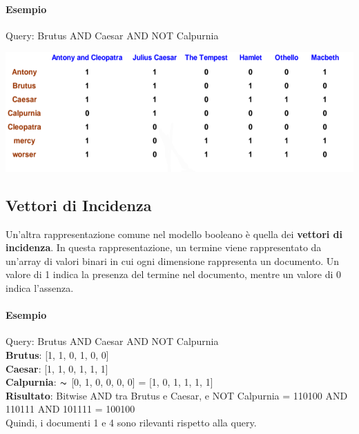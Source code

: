 \documentclass{report}
\begin{document}
	\paragraph{Esempio}
	Query: Brutus AND Caesar AND NOT Calpurnia
	\begin{center}
		\includegraphics[scale=0.6]{assets/booleanmatrix.png}
	\end{center}

	\subsection{Vettori di Incidenza}
	Un'altra rappresentazione comune nel modello booleano è quella dei \textbf{vettori di incidenza}. In questa rappresentazione, un termine viene rappresentato da un'array di valori binari in cui ogni dimensione rappresenta un documento. Un valore di 1 indica la presenza del termine nel documento, mentre un valore di 0 indica l'assenza. 

	\paragraph{Esempio}
	Query: Brutus AND Caesar AND NOT Calpurnia
	\vspace{\baselineskip}\\
	\textbf{Brutus}: [1, 1, 0, 1, 0, 0]\\
	\textbf{Caesar}: [1, 1, 0, 1, 1, 1]\\
	\textbf{Calpurnia}: $\thicksim$ [0, 1, 0, 0, 0, 0] = [1, 0, 1, 1, 1, 1]
	\vspace{\baselineskip}\\
	\textbf{Risultato}: Bitwise AND tra Brutus e Caesar, e NOT Calpurnia = 110100 AND 110111 AND 101111 = 100100
	\vspace{\baselineskip}\\
	Quindi, i documenti 1 e 4 sono rilevanti rispetto alla query.
\end{document}
